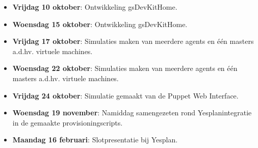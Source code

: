 \documentclass[a4paper,11pt]{article}
\theoremstyle{definition}
\begin{document}
\begin{itemize}
    
         \item \textbf{Vrijdag 10 oktober}: Ontwikkeling gsDevKitHome.
           \item \textbf{Woensdag 15 oktober}: Ontwikkeling gsDevKitHome.
        \item \textbf{Vrijdag 17 oktober}: Simulaties maken van meerdere agents 
        en één masters a.d.hv. virtuele machines.
     \item \textbf{Woensdag 22 oktober}: Simulaties maken van meerdere agents 
        en één masters a.d.hv. virtuele machines.
     \item \textbf{Vrijdag 24 oktober}: Simulatie gemaakt van de Puppet Web 
     Interface.
        \item \textbf{Woensdag 19 november}: Namiddag samengezeten rond Yesplanintegratie 
        in de gemaakte provisioningscripts.
        \item \textbf{Maandag 16 februari}: Slotpresentatie bij Yesplan.

\end{itemize}

\newpage
\end{document}
